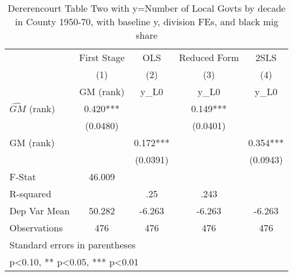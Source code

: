 \begin{table}[htbp]\centering
\def\sym#1{\ifmmode^{#1}\else\(^{#1}\)\fi}
\caption{Dererencourt Table Two with y=Number of Local Govts by decade in County 1950-70, with baseline y, division FEs, and black mig share}
\begin{tabular}{l*{4}{c}}
\toprule
                    & First Stage   &         OLS   &Reduced Form   &        2SLS   \\
                    &\multicolumn{1}{c}{(1)}&\multicolumn{1}{c}{(2)}&\multicolumn{1}{c}{(3)}&\multicolumn{1}{c}{(4)}\\
                    &\multicolumn{1}{c}{GM  (rank)}&\multicolumn{1}{c}{y\_L0}&\multicolumn{1}{c}{y\_L0}&\multicolumn{1}{c}{y\_L0}\\
\midrule
$\hat{GM}$ (rank)   &       0.420***&               &       0.149***&               \\
                    &    (0.0480)   &               &    (0.0401)   &               \\
\addlinespace
GM  (rank)          &               &       0.172***&               &       0.354***\\
                    &               &    (0.0391)   &               &    (0.0943)   \\
\midrule
F-Stat              &      46.009   &               &               &               \\
R-squared           &               &         .25   &        .243   &               \\
Dep Var Mean        &      50.282   &      -6.263   &      -6.263   &      -6.263   \\
Observations        &         476   &         476   &         476   &         476   \\
\bottomrule
\multicolumn{5}{l}{\footnotesize Standard errors in parentheses}\\
\multicolumn{5}{l}{\footnotesize * p<0.10, ** p<0.05, *** p<0.01}\\
\end{tabular}
\end{table}
